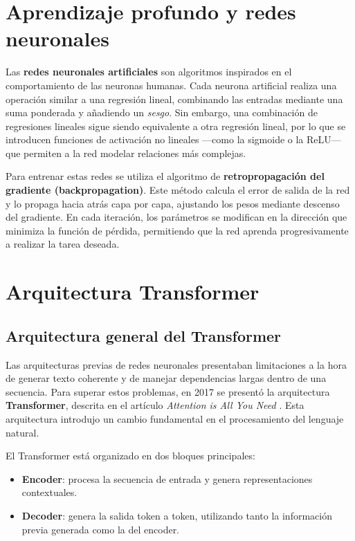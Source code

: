 \section{Aprendizaje profundo y redes neuronales}
\label{redes-neuronales}

Las \textbf{redes neuronales artificiales} son algoritmos inspirados en el comportamiento de las neuronas humanas. Cada neurona artificial realiza una operación similar a una regresión lineal, combinando las entradas mediante una suma ponderada y añadiendo un \textit{sesgo}. Sin embargo, una combinación de regresiones lineales sigue siendo equivalente a otra regresión lineal, por lo que se introducen funciones de activación no lineales —como la sigmoide o la ReLU— que permiten a la red modelar relaciones más complejas.

Para entrenar estas redes se utiliza el algoritmo de \textbf{retropropagación del gradiente (backpropagation)}. Este método calcula el error de salida de la red y lo propaga hacia atrás capa por capa, ajustando los pesos mediante descenso del gradiente. En cada iteración, los parámetros se modifican en la dirección que minimiza la función de pérdida, permitiendo que la red aprenda progresivamente a realizar la tarea deseada.


\section{Arquitectura Transformer}
\label{transformers}

\subsection{Arquitectura general del Transformer}

Las arquitecturas previas de redes neuronales presentaban limitaciones a la hora de generar texto coherente y de manejar dependencias largas dentro de una secuencia. Para superar estos problemas, en 2017 se presentó la arquitectura \textbf{Transformer}, descrita en el artículo \textit{Attention is All You Need} \cite{vaswani2023attentionneed}. Esta arquitectura introdujo un cambio fundamental en el procesamiento del lenguaje natural.

El Transformer está organizado en dos bloques principales:

\begin{itemize}
    \item \textbf{Encoder}: procesa la secuencia de entrada y genera representaciones contextuales.
    \item \textbf{Decoder}: genera la salida token a token, utilizando tanto la información previa generada como la del encoder.
\end{itemize}


